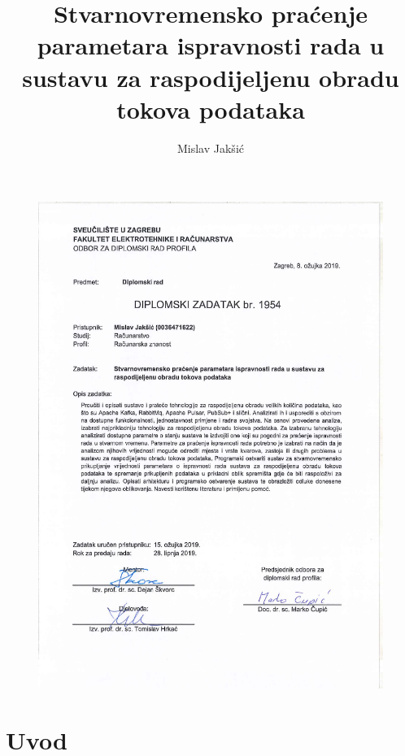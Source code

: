 \documentclass[utf8, diplomski, lmodern, numeric]{fer}
\begin{document}

\title{Stvarnovremensko praćenje parametara ispravnosti rada u sustavu za raspodijeljenu obradu tokova podataka}

\author{Mislav Jakšić}

\maketitle

\begin{figure}[H]
    \centering
    \hspace*{-35mm}
    \includegraphics{task.pdf}
\end{figure}

\zahvala{}

\tableofcontents



\chapter{Uvod}
\end{document}

